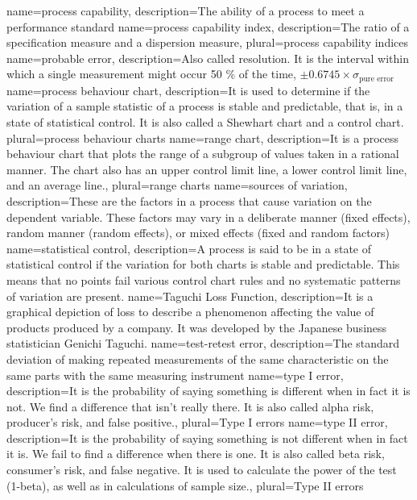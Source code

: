 {
    name={process capability},
    description={The ability of a process to meet a performance standard}
}
{
    name={process capability index},
    description={The ratio of a specification measure and a dispersion measure},
    plural={process capability indices}
}
{
    name={probable error},
    description={Also called resolution. It is the interval within which a single measurement might occur 50 \% of the time, $\pm 0.6745 \times \sigma_\text{pure error}$}
}
{
    name={process behaviour chart},
    description={It is used to determine if the variation of a sample statistic of a process is stable and predictable, that is, in a state of statistical control. It is also called a Shewhart chart and a control chart.}
    plural={process behaviour charts}
}
{
    name={range chart},
    description={It is a process behaviour chart that plots the range of a subgroup of values taken in a rational manner. The chart also has an upper control limit line, a lower control limit line, and an average line.},
    plural={range charts}
}
{
    name={sources of variation},
    description={These are the factors in a process that cause variation on the dependent variable. These factors may vary in a deliberate manner (fixed effects), random manner (random effects), or mixed effects (fixed and random factors)}
}
{
    name={statistical control},
    description={A process is said to be in a state of statistical control if the variation for both charts is stable and predictable. This means that no points fail various control chart rules and no systematic patterns of variation are present.}
}
{
    name={Taguchi Loss Function},
    description={It is a graphical depiction of loss to describe a phenomenon affecting the value of products produced by a company. It was developed by the Japanese business statistician Genichi Taguchi.}
}
{
    name={test-retest error},
    description={The standard deviation of making repeated measurements of the same characteristic on the same parts with the same measuring instrument}
}
{
    name={type I error},
    description={It is the probability of saying something is different when in fact it is not. We find a difference that isn’t really there. It is also called alpha risk, producer's risk, and false positive.},
    plural={Type I errors}
}
{
    name={type II error},
    description={It is the probability of saying something is not different when in fact it is. We fail to find a difference when there is one. It is also called beta risk, consumer’s risk, and false negative. It is used to calculate the power of the test (1-beta), as well as in calculations of sample size.},
    plural={Type II errors}
}
